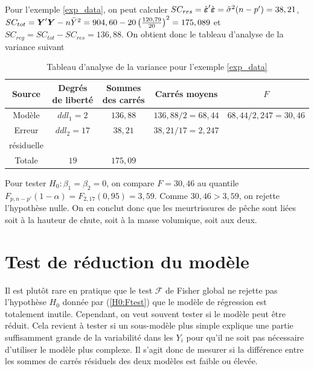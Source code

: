 \begin{exemple}
Pour l'exemple \ref{exp_data}, on peut calculer  $SC_{res}=\hat{\mbox{\boldmath$\varepsilon$\unboldmath}}'\hat{\mbox{\boldmath$\varepsilon$\unboldmath}}=\hat\sigma^2 (n-p')=38,21$, $SC_{tot}=\mbox{\boldmath$Y$\unboldmath}'\mbox{\boldmath$Y$\unboldmath}-n\bar{Y}^2=904,60-20\left(\frac{120,79}{20}\right)^2=175,089$ et $SC_{reg}=SC_{tot}-SC_{res}=136,88.$ On obtient donc le tableau d'analyse de la variance suivant

\begin{table}[htb!]
\caption{Tableau d'analyse de la variance pour l'exemple \ref{exp_data}}
\centering
\begin{footnotesize}
\renewcommand{\arraystretch}{1.6}
\begin{tabular}{ccccc}\hline
Source & Degrés de liberté & Sommes des carrés & Carrés moyens & $F$ \\ \hline
Modèle & $ddl_1=2$ &
$136,88$ & $136,88/2=68,44$ & $68,44/2,247=30,46$\\
Erreur & $ddl_2=17$ & $38,21$ & $38,21/17=2,247$ & \\
résiduelle & & & \\
\hline Totale & $19$ & $175,09$ & &
\end{tabular}
\end{footnotesize}
\end{table}

Pour tester $H_0:\beta_1=\beta_2=0$, on compare $F=30,46$ au quantile $F_{p,n-p'}(1-\alpha)=F_{2,17}(0,95)=3,59$. Comme $30,46>3,59$, on rejette l'hypothèse nulle. On en conclut donc que les meurtrissures de pêche sont liées soit à la hauteur de chute, soit à la masse volumique, soit aux deux.
\end{exemple}


\newpage

\section{Test de réduction du modèle}

Il est plut\^ot rare en pratique que le test $\mathcal F$ de Fisher global ne
rejette pas l'hypoth\`ese $H_0$ donnée par (\ref{H0:Ftest})
que le modèle de régression est
totalement inutile. Cependant, on veut souvent tester si
le modèle peut être réduit. Cela revient à tester
si un sous-modèle plus simple explique une partie suffisamment
grande de la variabilité dans les $Y_i$ pour qu'il ne soit pas
nécessaire d'utiliser le modèle plus complexe. Il s'agit donc de mesurer si
la différence entre les sommes de carrés résiduels des
deux modèles est faible ou élevée.

